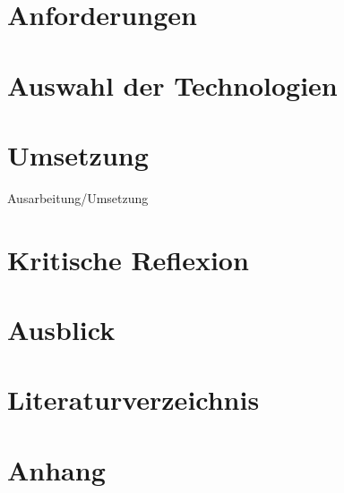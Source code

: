 \documentclass[a4paper,12pt]{report}
\begin{document}
	\newpage
	
	\chapter{Anforderungen}
	
	
	\newpage
	
	\chapter{Auswahl der Technologien}
	
	
	
	
	
	
	\newpage
	
	\chapter{Umsetzung}
	
	
	
	
	
Ausarbeitung/Umsetzung	\newpage

	
	
	\chapter{Kritische Reflexion}
	
	
	\newpage 
	
	\chapter{Ausblick}
	
	
	\newpage
	
	\newpage
	\pagestyle{fancy}

	\chapter*{Literaturverzeichnis}
	\printbibliography
	\newpage

	\cleardoublepage

	\chapter*{Anhang}


\newpage

	
\end{document}
